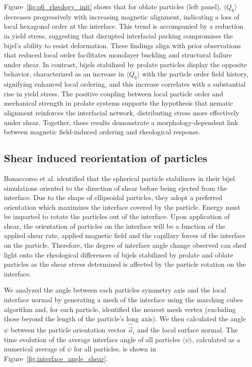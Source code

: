 Figure~\ref{fig:q6_rheology_init} shows that for oblate particles (left panel), $\langle Q_6 \rangle$ decreases progressively with increasing magnetic alignment, 
indicating a loss of local hexagonal
order at the interface. This trend is accompanied by a reduction in yield stress, suggesting that disrupted interfacial packing compromises the bijel's 
ability to resist deformation. These findings align with prior observations that reduced local order facilitates monolayer buckling and structural failure 
under shear. In contrast, bijels stabilized by prolate particles display the opposite behavior, characterized as an increase in $\langle Q_6 \rangle$ with
the particle order field history, signifying enhanced local ordering, and this increase correlates with a substantial rise in yield stress. The positive 
coupling between local particle order and mechanical strength in prolate systems supports the hypothesis that nematic alignment reinforces the interfacial 
network, distributing stress more effectively under shear. Together, these results demonstrate a morphology-dependent link between magnetic field-induced 
ordering and rheological response. 

\subsection{Shear induced reorientation of particles}

Bonaccorso et al. identified that the spherical particle stabilizers in their bijel simulations oriented to the direction of shear before being
ejected from the interface. \cite{bonaccorso_shear_2020} Due to the shape of ellipsoidal particles, they adopt a preferred orientation which
maximizes the interface covered by the particle. \cite{davies_dipolar_2015, davies_interface_2014} Energy must be imparted to rotate the particles
out of the interface. Upon application of shear, the orientation of particles on the interface will be a function of the applied shear rate, 
applied magnetic field and the capillary forces of the interface on the particle. \cite{cao_modeling_2021, chhabra_drag_1999, brenner_stokes_1963, naga_capillary_2021}
Therefore, the degree of interface angle change observed can shed light onto the rheological 
differences of bijels stabilized by prolate and oblate particles as the shear stress determined is affected by the particle rotation on the interface. 

We analyzed the angle between each particles symmetry axis and the local interface normal by generating a mesh of the interface using the marching 
cubes algorithm and, for each particle, identified the nearest mesh vertex (excluding those beyond the length of the particle's long axis). We then calculated 
the angle $\psi$ between the particle orientation vector \(\hat{\vec{o}}_i\) and the local surface normal. The time evolution of the average interface
angle of all particles $\langle \psi \rangle$, calculated as a numerical average of $\psi$ for all particles, is shown in Figure~\ref{fig:interface_angle_shear}.

